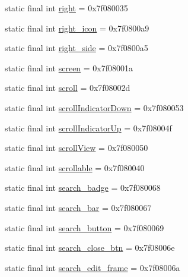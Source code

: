 \begin{CompactItemize}
\item 
static final int \hyperlink{classandroid_1_1support_1_1v7_1_1palette_1_1_r_1_1id_02eb85ec29dd45741292c9b926e02521}{right} = 0x7f080035
\item 
static final int \hyperlink{classandroid_1_1support_1_1v7_1_1palette_1_1_r_1_1id_5dfb325e05ec31c1fd1c05f21143ba27}{right\_\-icon} = 0x7f0800a9
\item 
static final int \hyperlink{classandroid_1_1support_1_1v7_1_1palette_1_1_r_1_1id_27487031e93f5a475f52775820dabee7}{right\_\-side} = 0x7f0800a5
\item 
static final int \hyperlink{classandroid_1_1support_1_1v7_1_1palette_1_1_r_1_1id_b36d32b07adbaef95c82e85f920a99ee}{screen} = 0x7f08001a
\item 
static final int \hyperlink{classandroid_1_1support_1_1v7_1_1palette_1_1_r_1_1id_e95c4e4b2d159456e6b5dec705ab958b}{scroll} = 0x7f08002d
\item 
static final int \hyperlink{classandroid_1_1support_1_1v7_1_1palette_1_1_r_1_1id_43a9cb422eb45cd002080443cf42d059}{scrollIndicatorDown} = 0x7f080053
\item 
static final int \hyperlink{classandroid_1_1support_1_1v7_1_1palette_1_1_r_1_1id_419193f6943b061cd3ac2cd2597469a9}{scrollIndicatorUp} = 0x7f08004f
\item 
static final int \hyperlink{classandroid_1_1support_1_1v7_1_1palette_1_1_r_1_1id_d00930083701a47938eb93cdd1c21bf8}{scrollView} = 0x7f080050
\item 
static final int \hyperlink{classandroid_1_1support_1_1v7_1_1palette_1_1_r_1_1id_9d49ae1cce4089ee294ce04352f25e08}{scrollable} = 0x7f080040
\item 
static final int \hyperlink{classandroid_1_1support_1_1v7_1_1palette_1_1_r_1_1id_b6ca7998cba35940baa798973f8e8f1a}{search\_\-badge} = 0x7f080068
\item 
static final int \hyperlink{classandroid_1_1support_1_1v7_1_1palette_1_1_r_1_1id_3c116d3511032c3521a6ae8ebea35097}{search\_\-bar} = 0x7f080067
\item 
static final int \hyperlink{classandroid_1_1support_1_1v7_1_1palette_1_1_r_1_1id_404d5842da462e9c289f8b4fac73ed42}{search\_\-button} = 0x7f080069
\item 
static final int \hyperlink{classandroid_1_1support_1_1v7_1_1palette_1_1_r_1_1id_c7832b7e12d47ac022351ffa37b48494}{search\_\-close\_\-btn} = 0x7f08006e
\item 
static final int \hyperlink{classandroid_1_1support_1_1v7_1_1palette_1_1_r_1_1id_3dc9dffc190814e59c8a47c29298f776}{search\_\-edit\_\-frame} = 0x7f08006a

\end{CompactItemize}
